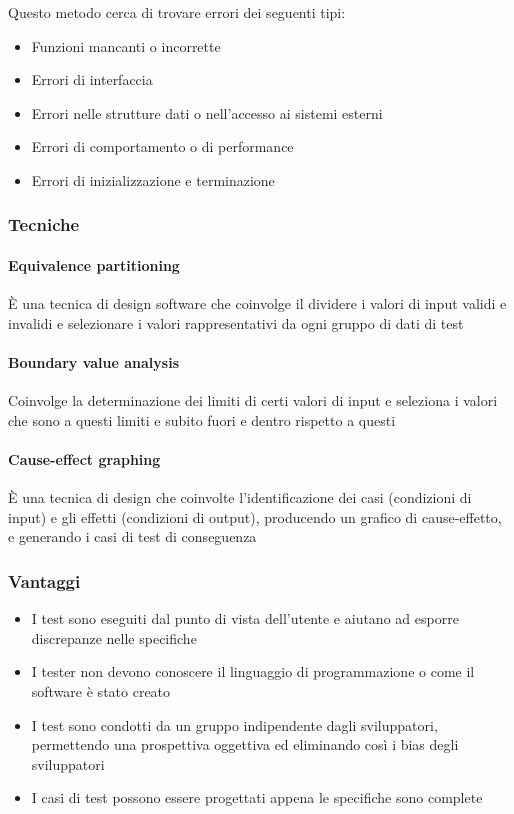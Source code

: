 \documentclass[11pt,a4paper]{book}
\begin{document}
Questo metodo cerca di trovare errori dei seguenti tipi:
\begin{itemize}
	\item Funzioni mancanti o incorrette
	\item Errori di interfaccia
	\item Errori nelle strutture dati o nell'accesso ai sistemi esterni
	\item Errori di comportamento o di performance
	\item Errori di inizializzazione e terminazione
\end{itemize}

\subsubsection{Tecniche}
\paragraph{Equivalence partitioning}
È una tecnica di design software che coinvolge il dividere i valori di input validi e invalidi e selezionare i valori rappresentativi da ogni gruppo di dati di test

\paragraph{Boundary value analysis}
Coinvolge la determinazione dei limiti di certi valori di input e seleziona i valori che sono a questi limiti e subito fuori e dentro rispetto a questi

\paragraph{Cause-effect graphing}
È una tecnica di design che coinvolte l'identificazione dei casi (condizioni di input) e gli effetti (condizioni di output), producendo un grafico di cause-effetto, e generando i casi di test di conseguenza

\subsubsection{Vantaggi}
\begin{itemize}
	\item I test sono eseguiti dal punto di vista dell'utente e aiutano ad esporre discrepanze nelle specifiche
	\item I tester non devono conoscere il linguaggio di programmazione o come il software è stato creato
	\item I test sono condotti da un gruppo indipendente dagli sviluppatori, permettendo una prospettiva oggettiva ed eliminando così i bias degli sviluppatori
	\item I casi di test possono essere progettati appena le specifiche sono complete
\end{itemize}
\end{document}
